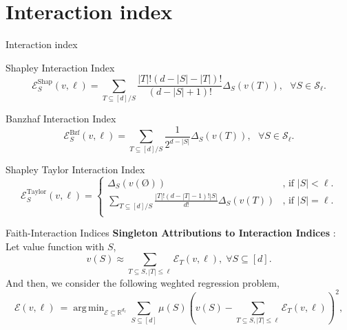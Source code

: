 \documentclass[10pt]{beamer}
\newcommand{\f}{v}
\newcommand{\ex}{\Expl}
\def\Expl{\mathcal{E}}
\newcommand{\setlessell}{\mathcal{S}_\ell }
\DeclareMathOperator*{\argmin}{arg\,min}
\begin{document}
\section[Interaction index]{Interaction index}
\begin{frame}{Interaction index}
    \begin{mydefbox}{Shapley Interaction Index}
        \begin{equation*}
            \label{eqn:closed_form_shap_inter}
            \ex_S^{\text{Shap}}(\f, \ell) =  \sum_{T \subseteq [d]/ S}  \frac{|T|! (d-|S|-|T|)!}{(d-|S|+1)!} \Delta_S(\f(T)),\ \ \  
            \forall S \in \setlessell.
            \tag{5}
        \end{equation*}
    \end{mydefbox}
\end{frame}
\begin{frame}
    \begin{mydefbox}{Banzhaf Interaction Index}
        \begin{equation*}
            \label{eqn:closed_form_bzf_inter}
            \ex^{\text{Bzf}}_S(\f,\ell) =  \sum_{T \subseteq [d]/S}  \frac{1}{2^{d-|S|}} \Delta_S(\f(T)),\ \ \  
            \forall  S \in \setlessell.
            \tag{6}
        \end{equation*}
    \end{mydefbox}
\end{frame}
\begin{frame}
    \begin{mydefbox}{Shapley Taylor Interaction Index}
        \begin{equation*}
            \label{eqn:def_taylor_shap}
            \ex_S^{\text{Taylor}}(\f,\ell) = 
            \begin{cases}
            \Delta_S(\f(\text{\O})) & \text{, if } |S| < \ell. \\
            \sum_{T \subseteq [d]/ S}  \frac{|T|!(d-|T|-1)!|S|}{d!} \Delta_S(\f(T)) & \text{, if } |S| = \ell. \\
            \end{cases}
            \tag{7}
        \end{equation*}
    \end{mydefbox}
\end{frame}
\begin{frame}{Faith-Interaction Indices}
    \textbf{Singleton Attributions to Interaction Indices} : \\
    Let value function with $S$, \[\f(S) \approx \sum_{T \subseteq S, |T| \leq \ell} \Expl_T(\f,\ell),\; \forall S \subseteq [d].\]
    And then, we consider the following weghted regression problem,
    \begin{equation*}
    \label{eqn:weighted_regression}
    \ex(\f, \ell) \ = \argmin_{\Expl \subseteq \mathbb{R}^{d_\ell} } 
    \sum_{S \subseteq [d]}  \mu(S) \left( \f(S) - \sum_{T \subseteq S , |T| \leq \ell}\Expl_T(\f,\ell) \right)^2,
    \tag{9}
    \end{equation*}
\end{frame}
\end{document}
